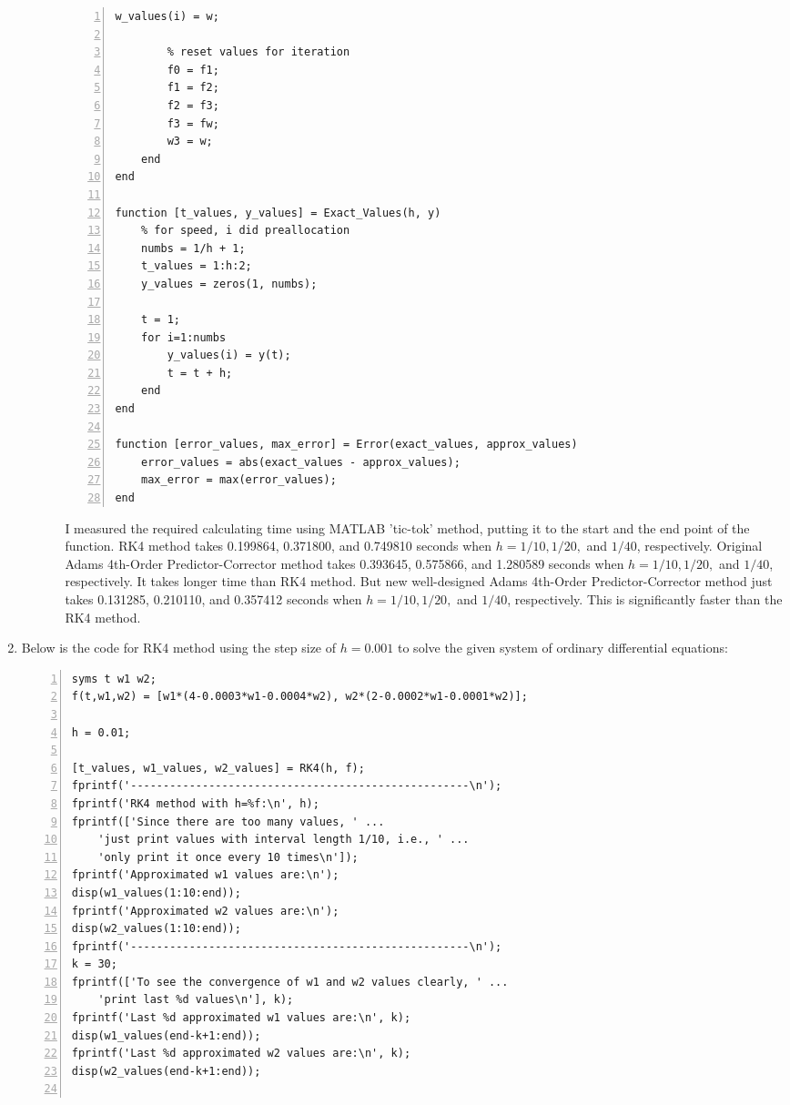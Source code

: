 \documentclass{article}
\begin{document}
\begin{enumerate}
\begin{enumerate}[wide=10pt]
\begin{enumerate}[wide=30pt]
\begin{lstlisting}[frame=single, numbers=left, style=Matlab-editor]
        w_values(i) = w;

        % reset values for iteration
        f0 = f1;
        f1 = f2;
        f2 = f3;
        f3 = fw;
        w3 = w;
    end
end

function [t_values, y_values] = Exact_Values(h, y)
    % for speed, i did preallocation
    numbs = 1/h + 1;
    t_values = 1:h:2;
    y_values = zeros(1, numbs);

    t = 1;
    for i=1:numbs
        y_values(i) = y(t);
        t = t + h;
    end
end

function [error_values, max_error] = Error(exact_values, approx_values)
    error_values = abs(exact_values - approx_values);
    max_error = max(error_values);
end
            \end{lstlisting} I measured the required calculating time using MATLAB 'tic-tok' method, putting it to the start and the end point of the function. RK4 method takes 0.199864, 0.371800, and 0.749810 seconds when $h=1/10, 1/20,$ and $1/40$, respectively. Original Adams 4th-Order Predictor-Corrector method takes 0.393645, 0.575866, and 1.280589 seconds when $h=1/10, 1/20,$ and $1/40$, respectively. It takes longer time than RK4 method. But new well-designed Adams 4th-Order Predictor-Corrector method just takes 0.131285, 0.210110, and 0.357412 seconds when $h=1/10, 1/20,$ and $1/40$, respectively. This is significantly faster than the RK4 method.
        \end{enumerate}
    \end{enumerate}
    \item Below is the code for RK4 method using the step size of $h=0.001$ to solve the given system of ordinary differential equations: \begin{lstlisting}[frame=single, numbers=left, style=Matlab-editor]
syms t w1 w2;
f(t,w1,w2) = [w1*(4-0.0003*w1-0.0004*w2), w2*(2-0.0002*w1-0.0001*w2)];

h = 0.01;

[t_values, w1_values, w2_values] = RK4(h, f);
fprintf('----------------------------------------------------\n');
fprintf('RK4 method with h=%f:\n', h);
fprintf(['Since there are too many values, ' ...
    'just print values with interval length 1/10, i.e., ' ...
    'only print it once every 10 times\n']);
fprintf('Approximated w1 values are:\n');
disp(w1_values(1:10:end));
fprintf('Approximated w2 values are:\n');
disp(w2_values(1:10:end));
fprintf('----------------------------------------------------\n');
k = 30;
fprintf(['To see the convergence of w1 and w2 values clearly, ' ...
    'print last %d values\n'], k);
fprintf('Last %d approximated w1 values are:\n', k);
disp(w1_values(end-k+1:end));
fprintf('Last %d approximated w2 values are:\n', k);
disp(w2_values(end-k+1:end));


\end{lstlisting}
\end{enumerate}
\end{document}

